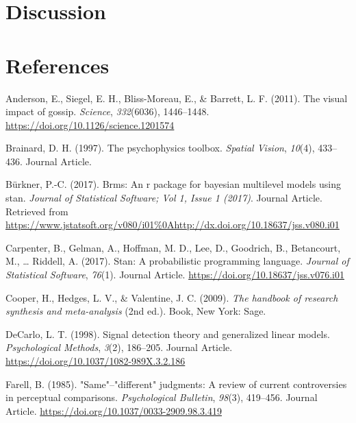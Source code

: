 \documentclass[
  english,
  man]{apa6}
\begin{document}
\hypertarget{discussion-2}{%
\section{Discussion}\label{discussion-2}}

\hypertarget{references}{%
\section{References}\label{references}}

\begingroup
\setlength{\parindent}{-0.5in}
\setlength{\leftskip}{0.5in}

\hypertarget{refs}{}
\leavevmode\hypertarget{ref-anderson_visual_2011}{}%
Anderson, E., Siegel, E. H., Bliss-Moreau, E., \& Barrett, L. F. (2011). The visual impact of gossip. \emph{Science}, \emph{332}(6036), 1446--1448. \url{https://doi.org/10.1126/science.1201574}

\leavevmode\hypertarget{ref-Brainard_1997}{}%
Brainard, D. H. (1997). The psychophysics toolbox. \emph{Spatial Vision}, \emph{10}(4), 433--436. Journal Article.

\leavevmode\hypertarget{ref-Buxfcrkner_2017}{}%
Bürkner, P.-C. (2017). Brms: An r package for bayesian multilevel models using stan. \emph{Journal of Statistical Software; Vol 1, Issue 1 (2017)}. Journal Article. Retrieved from \url{https://www.jstatsoft.org/v080/i01\%0Ahttp://dx.doi.org/10.18637/jss.v080.i01}

\leavevmode\hypertarget{ref-Carpenter_2017_stan}{}%
Carpenter, B., Gelman, A., Hoffman, M. D., Lee, D., Goodrich, B., Betancourt, M., \ldots{} Riddell, A. (2017). Stan: A probabilistic programming language. \emph{Journal of Statistical Software}, \emph{76}(1). Journal Article. \url{https://doi.org/10.18637/jss.v076.i01}

\leavevmode\hypertarget{ref-Cooper_2009_handbook}{}%
Cooper, H., Hedges, L. V., \& Valentine, J. C. (2009). \emph{The handbook of research synthesis and meta-analysis} (2nd ed.). Book, New York: Sage.

\leavevmode\hypertarget{ref-DeCarlo_1998}{}%
DeCarlo, L. T. (1998). Signal detection theory and generalized linear models. \emph{Psychological Methods}, \emph{3}(2), 186--205. Journal Article. \url{https://doi.org/10.1037/1082-989X.3.2.186}

\leavevmode\hypertarget{ref-Farell_1985}{}%
Farell, B. (1985). "Same"--"different" judgments: A review of current controversies in perceptual comparisons. \emph{Psychological Bulletin}, \emph{98}(3), 419--456. Journal Article. \url{https://doi.org/10.1037/0033-2909.98.3.419}
\end{document}
